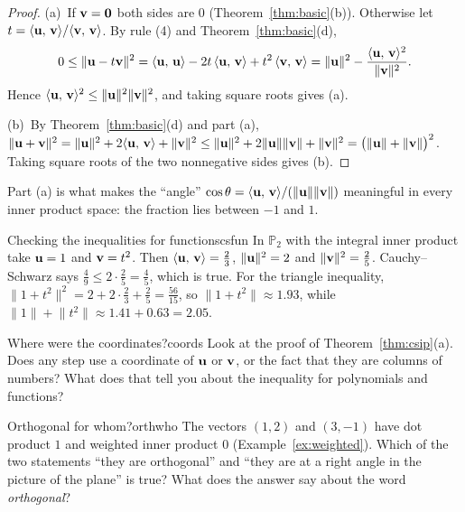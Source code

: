 \documentclass[11pt]{article}
\begin{document}
\begin{proof}
(a)~If $\mathbf{v}=\mathbf{0}$ both sides are $0$ (Theorem~\ref{thm:basic}(b)). Otherwise let $t=\langle \mathbf{u},\,\mathbf{v}\rangle/\langle \mathbf{v},\,\mathbf{v}\rangle$. By rule (4) and Theorem~\ref{thm:basic}(d),
\[
0\le\lVert\mathbf{u}-t\mathbf{v}\rVert^2=\langle \mathbf{u},\,\mathbf{u}\rangle-2t\,\langle \mathbf{u},\,\mathbf{v}\rangle+t^2\,\langle \mathbf{v},\,\mathbf{v}\rangle=\lVert\mathbf{u}\rVert^2-\frac{\langle \mathbf{u},\,\mathbf{v}\rangle^2}{\lVert\mathbf{v}\rVert^2}.
\]
Hence $\langle \mathbf{u},\,\mathbf{v}\rangle^2\le\lVert\mathbf{u}\rVert^2\lVert\mathbf{v}\rVert^2$, and taking square roots gives (a).

(b)~By Theorem~\ref{thm:basic}(d) and part (a), $\lVert\mathbf{u}+\mathbf{v}\rVert^2=\lVert\mathbf{u}\rVert^2+2\langle \mathbf{u},\,\mathbf{v}\rangle+\lVert\mathbf{v}\rVert^2\le\lVert\mathbf{u}\rVert^2+2\lVert\mathbf{u}\rVert\lVert\mathbf{v}\rVert+\lVert\mathbf{v}\rVert^2=\bigl(\lVert\mathbf{u}\rVert+\lVert\mathbf{v}\rVert\bigr)^2$. Taking square roots of the two nonnegative sides gives (b).
\end{proof}

Part (a) is what makes the ``angle'' $\cos\theta=\langle \mathbf{u},\,\mathbf{v}\rangle/(\lVert\mathbf{u}\rVert\lVert\mathbf{v}\rVert)$ meaningful in every inner product space: the fraction lies between $-1$ and $1$.

\begin{exmp}{Checking the inequalities for functions}{csfun}
In $\mathbb{P}_2$ with the integral inner product take $\mathbf{u}=1$ and $\mathbf{v}=t^2$. Then $\langle \mathbf{u},\,\mathbf{v}\rangle=\tfrac23$, $\lVert\mathbf{u}\rVert^2=2$ and $\lVert\mathbf{v}\rVert^2=\tfrac25$. Cauchy--Schwarz says $\tfrac49\le2\cdot\tfrac25=\tfrac45$, which is true. For the triangle inequality, $\lVert1+t^2\rVert^2=2+2\cdot\tfrac23+\tfrac25=\tfrac{56}{15}$, so $\lVert1+t^2\rVert\approx1.93$, while $\lVert1\rVert+\lVert t^2\rVert\approx1.41+0.63=2.05$.
\end{exmp}

\begin{think}{Where were the coordinates?}{coords}
Look at the proof of Theorem~\ref{thm:csip}(a). Does any step use a coordinate of $\mathbf{u}$ or $\mathbf{v}$, or the fact that they are columns of numbers? What does that tell you about the inequality for polynomials and functions?
\end{think}

\begin{think}{Orthogonal for whom?}{orthwho}
The vectors $(1,2)$ and $(3,-1)$ have dot product $1$ and weighted inner product $0$ (Example~\ref{ex:weighted}). Which of the two statements ``they are orthogonal'' and ``they are at a right angle in the picture of the plane'' is true? What does the answer say about the word \emph{orthogonal}?
\end{think}
\end{document}

